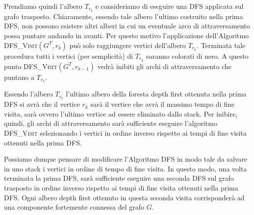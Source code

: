 \begin{center}
\end{center}

Prendiamo quindi l'albero $T_{r_{k}}$ e consideriamo di eseguire una DFS applicata sul grafo trasposto. Chiaramente, essendo tale albero l'ultimo costruito nella prima DFS, non possono esistere altri alberi in cui un eventuale arco di attraversamento possa puntare andando in avanti. Per questo motivo l'applicazione dell'Algoritmo \textsc{DFS\_Visit}$(G^{T},r_{k})$ può solo raggiungere vertici dell'albero $T_{r_{k}}$. Terminata tale procedura tutti i vertici (per semplicità) di $T_{r_{k}}$ saranno colorati di nero. A questo punto \textsc{DFS\_Visit}$(G^{T},r_{k-1})$ vedrà inibiti gli archi di attraversamento che puntano a $T_{r_{k}}$.

Essendo l'albero $T_{r_{k}}$ l'ultimo albero della foresta depth first ottenuta nella prima DFS si avrà che il vertice $r_{k}$ sarà il vertice che avrà il massimo tempo di fine visita, sarà ovvero l'ultimo vertice ad essere eliminato dallo stack. Per inibire, quindi, gli archi di attraversamento sarà sufficiente eseguire l'algoritmo \textsc{DFS\_Visit} selezionando i vertici in ordine inverso rispetto ai tempi di fine visita ottenuti nella prima DFS.

Possiamo dunque pensare di modificare l'Algoritmo DFS in modo tale da salvare in uno stack i vertici in ordine di tempo di fine visita. In questo modo, una volta terminata la prima DFS, sarà sufficiente eseguire una seconda DFS sul grafo trasposto in ordine inverso rispetto ai tempi di fine visita ottenuti nella prima DFS. Ogni albero depth first ottenuto in questa seconda visita corrisponderà ad una componente fortemente connessa del grafo $G$.

